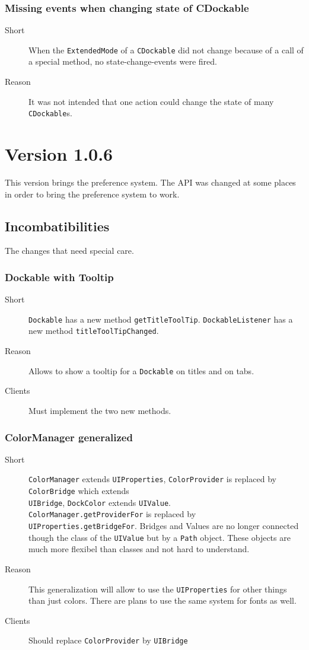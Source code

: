 \documentclass[a4paper,10pt]{article}
\newcommand{\src}[1]{\lstinline[basicstyle=\normalsize\ttfamily,keywordstyle=\normalsize\ttfamily,identifierstyle=\normalsize\ttfamily]|#1|}
\newcommand{\short}{\item[Short]}
\newcommand{\why}{\item[Reason]}
\newcommand{\clients}{\item[Clients]}
\begin{document}
\subsubsection{Missing events when changing state of CDockable}
\begin{description}
 \short When the \src{ExtendedMode} of a \src{CDockable} did not change because of a call of a special method, no state-change-events were fired.
 \why It was not intended that one action could change the state of many \src{CDockable}s.
\end{description}

\section{Version 1.0.6}
This version brings the preference system. The API was changed at some places in order to bring the preference system to work.

\subsection{Incombatibilities}
The changes that need special care.

\subsubsection{Dockable with Tooltip}
\begin{description}
 \short \src{Dockable} has a new method \src{getTitleToolTip}. \src{DockableListener} has a new method \src{titleToolTipChanged}.
 \why Allows to show a tooltip for a \src{Dockable} on titles and on tabs.
 \clients Must implement the two new methods.
\end{description}

\subsubsection{ColorManager generalized}
\begin{description}
 \short \src{ColorManager} extends \src{UIProperties}, \src{ColorProvider} is replaced by \src{ColorBridge} which extends \\\src{UIBridge}, \src{DockColor} extends \src{UIValue}. \\\src{ColorManager.getProviderFor} is replaced by \\\src{UIProperties.getBridgeFor}. Bridges and Values are no longer connected though the class of the \src{UIValue} but by a \src{Path} object. These objects are much more flexibel than classes and not hard to understand.
 \why This generalization will allow to use the \src{UIProperties} for other things than just colors. There are plans to use the same system for fonts as well.
 \clients Should replace \src{ColorProvider} by \src{UIBridge}
\end{description}
\end{document}
